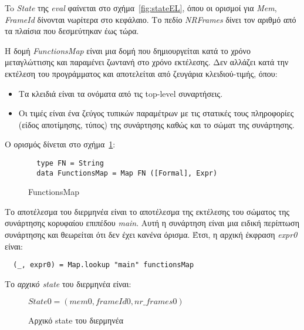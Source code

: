 \documentclass[diploma]{softlab-thesis}
\begin{document}
To \textit{State} της \textit{eval} φαίνεται στο σχήμα~\ref{fig:stateEL},
όπου οι ορισμοί για \textit{Mem}, \textit{FrameId} δίνονται νωρίτερα στο κεφάλαιο. Το πεδίο \textit{NRFrames}
δίνει τον αριθμό από τα πλαίσια που δεσμεύτηκαν έως τώρα. 

H δομή \textit{FunctionsMap} είναι μια δομή που δημιουργείται κατά το χρόνο μεταγλώττισης και παραμένει ζωντανή στο χρόνο εκτέλεσης. 
Δεν αλλάζει κατά την εκτέλεση του προγράμματος και αποτελείται από ζευγάρια κλειδιού-τιμής, όπου:
\begin{itemize} 
  \item Τα κλειδιά είναι τα ονόματα από τις top-level συναρτήσεις.
  \item Οι τιμές είναι ένα ζεύγος τυπικών παραμέτρων με τις στατικές τους πληροφορίες (είδος αποτίμησης, τύπος)
  της συνάρτησης καθώς και το σώματ της συνάρτησης.
\end{itemize}

Ο ορισμός δίνεται στο σχήμα~\ref{fig:functionsmapel}:
\begin{figure}[h]
\begin{verbatim}
  type FN = String 
  data FunctionsMap = Map FN ([Formal], Expr)
\end{verbatim}
\caption{FunctionsMap\label{fig:functionsmapel}}
\end{figure}

Το αποτέλεσμα του διερμηνέα είναι το αποτέλεσμα της εκτέλεσης του σώματος της συνάρτησης κορυφαίου επιπέδου \textit{main}.
Αυτή η συνάρτηση είναι μια ειδική περίπτωση συνάρτησης και θεωρείται ότι δεν έχει κανένα όρισμα. Έτσι, η αρχική έκφραση
\textit{expr0} είναι: 
\begin{verbatim}
  (_, expr0) = Map.lookup "main" functionsMap
\end{verbatim}

Το \textit{αρχικό state} του διερμηνέα είναι:
\begin{figure}[h]
$ 
  \mathit{State0 = (mem0, frameId0, nr\_frames0) }
$
\caption{Αρχικό state του διερμηνέα\label{fig:state0el}}
\end{figure}
\end{document}
